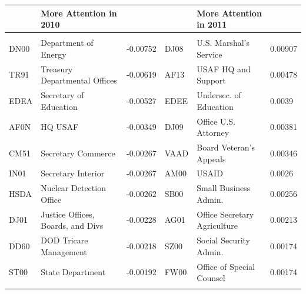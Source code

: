 \documentclass{beamer}
\begin{document}
\begin{frame}
\begin{table}[!htbp] \centering 
\tiny
\begin{tabular}{@{\extracolsep{5pt}} llllll} 
\\[-1.8ex]\hline 
& More Attention in 2010 &&& More Attention in 2011 & \\
\hline \\[-1.8ex] 
DN00 & Department of Energy       & -0.00752 & DJ08 & U.S. Marshal's Service & 0.00907 \\ 
TR91 & Treasury Departmental Offices  & -0.00619 & AF13 & USAF HQ and Support &  0.00478 \\ 
EDEA & Secretary of Education          & -0.00527 & EDEE & Undersec. of Education &  0.0039 \\ 
AF0N & HQ USAF                    & -0.00349 & DJ09 & Office U.S. Attorney     & 0.00381 \\ 
CM51 & Secretary Commerce         & -0.00267 & VAAD & Board Veteran's Appeals & 0.00346 \\ 
IN01 & Secretary Interior         & -0.00267 & AM00      & USAID &  0.0026 \\ 
HSDA & Nuclear Detection Office     & -0.00262 & SB00 & Small Business Admin. & 0.00256 \\ 
DJ01 & Justice Offices, Boards, and Divs & -0.00228 & AG01 & Office Secretary Agriculture & 0.00213 \\ 
DD60 & DOD Tricare Management     & -0.00218 & SZ00 & Social Security Admin. & 0.00174 \\ 
ST00 & State Department           & -0.00192 & FW00 & Office of Special Counsel& 0.00174 \\ 
\hline \\[-1.8ex] 
\end{tabular} 
\end{table}
\end{frame}
\end{document}
